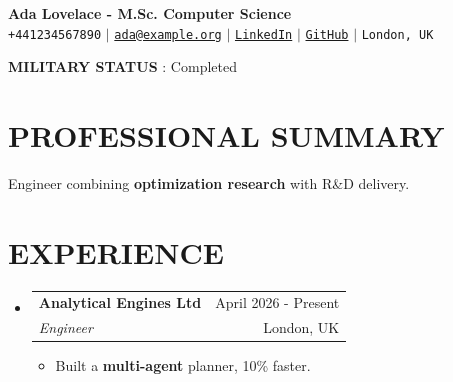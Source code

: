 \documentclass[letterpaper,11pt]{article}
\makeatletter
\newcommand{\resumeItem}[1]{
  \item\small{
    {#1 \vspace{-1pt}}
  }
}
\newcommand{\resumeSubheading}[4]{
  \vspace{-1pt}\item
    \begin{tabular*}{\textwidth}[t]{l@{\extracolsep{\fill}}r}
      \textbf{#1} & {\color{dark-grey}\small #2}\vspace{1pt}\\ %
      \textit{#3} & {\color{dark-grey} \small #4}\\ %
    \end{tabular*}\vspace{-4pt}
}
\newcommand{\resumeSubHeadingListStart}{\begin{itemize}[leftmargin=0in, label={}]}
\newcommand{\resumeSubHeadingListEnd}{\end{itemize}}
\newcommand{\resumeItemListStart}{\begin{itemize}}
\newcommand{\resumeItemListEnd}{\end{itemize}\vspace{0pt}}
\makeatother
\begin{document}
\begin{center}
    \textbf{\Huge Ada Lovelace - M.Sc. Computer Science} \\ \vspace{5pt}
    \small
    \hspace{1pt} \hspace{2pt}\texttt{+441234567890} \hspace{1pt} $|$
    \hspace{1pt} \hspace{2pt}\texttt{\href{mailto:ada@example.org}{ada@example.org}} \hspace{1pt} $|$
    \hspace{1pt} \hspace{2pt}\texttt{\href{https://www.linkedin.com/in/ada/}{LinkedIn}} \hspace{1pt} $|$
    \hspace{1pt} \hspace{2pt}\texttt{\href{https://github.com/ada}{GitHub}} \hspace{1pt} $|$
    \hspace{1pt} \hspace{2pt}\texttt{London, UK}
    \\ \vspace{-3pt}
\end{center}

\textbf{MILITARY STATUS} : Completed

\section{PROFESSIONAL SUMMARY}
\small{
Engineer combining \textbf{optimization research} with R\&D delivery.
}
%

\section{EXPERIENCE}
  \resumeSubHeadingListStart
    \resumeSubheading
      {Analytical Engines Ltd}{April 2026 - Present}
      {Engineer}{London, UK}
      \resumeItemListStart
        \resumeItem{Built a \textbf{multi-agent} planner, 10\% faster.}
      \resumeItemListEnd
  \resumeSubHeadingListEnd
\end{document}
